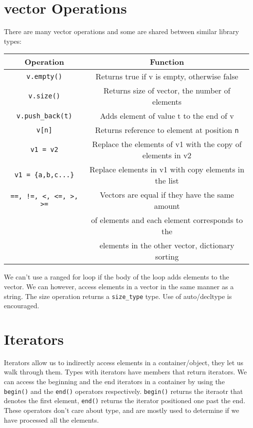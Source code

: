 \documentclass[12pt, a4paper]{report}
\begin{document}
\section{vector Operations}
There are many vector operations and some are shared between similar library types:
\begin{center}
	\begin{tabular}{ |c|c| }
		\hline
		\textbf{Operation} & \textbf{Function} \\
		\hline
		\verb|v.empty()| & Returns true if v is empty, otherwise false \\
		\hline
		\verb|v.size()| & Returns size of vector, the number of elements \\
		\hline
		\verb|v.push_back(t)| & Adds element of value t to the end of v \\
		\hline
		\verb|v[n]| & Returns reference to element at position \verb|n| \\
		\hline
		\verb|v1 = v2| & Replace the elements of v1 with the copy of elements in v2 \\
		\hline
		\verb|v1 = {a,b,c...}| & Replace elements in v1 with copy elements in the list \\
		\hline
		\verb|==, !=, <, <=, >, >=| & Vectors are equal if they have the same amount \\
		 & of elements and each element corresponds to the \\
		 & elements in the other vector, dictionary sorting \\
		\hline
	\end{tabular}
\end{center}
We can't use a ranged for loop if the body of the loop adds elements to the vector. We can however, access elements in a vector in the same manner as a string.
The size operation returns a \verb|size_type| type. Use of auto/decltype is encouraged.
\section{Iterators}
Iterators allow us to indirectly access elements in a container/object, they let us walk through them. Types with iterators have members that return iterators.
We can access the beginning and the end iterators in a container by using the \verb|begin()| and the \verb|end()| operators respectively. 
\verb|begin()| returns the iteraotr that denotes the first element, \verb|end()| returns the iterator positioned one past the end.
These operators don't care about type, and are mostly used to determine if we have processed all the elements.
\end{document}
